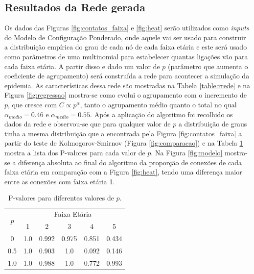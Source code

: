 \subsection{Resultados da Rede gerada}

Os dados das Figuras 
\ref{fig:contatos_faixa} e \ref{fig:heat} serão utilizados como \textit{inputs} do Modelo de Configuração Ponderado, onde aquele vai ser usado para construir a distribuição empírica do grau de cada nó de cada faixa etária e este será usado como parâmetros de uma multinomial para estabelecer quantas ligações vão para cada faixa etária. A partir disso e dado um valor de $p$ 
(parâmetro que aumenta o coeficiente de agrupamento)
será construída a rede para acontecer a simulação da epidemia. As características dessa rede são mostradas na Tabela \ref{table:rrede} e na Figura \ref{fig:regressao}
mostra-se como evolui o agrupamento com o incremento de $p$, que cresce com $C \propto p^{\alpha}$, tanto o agrupamento médio quanto o total no qual $\alpha_{medio } = 0.46$ e $\alpha_{medio } = 0.55$. Após a aplicação do algoritmo foi recolhido os dados da rede e observou-se que para qualquer valor de $p$ a distribuição de graus tinha a mesma distribuição que a encontrada pela Figura \ref{fig:contatos_faixa} a partir do teste de Kolmogorov-Smirnov (Figura \ref{fig:comparacao}) \cite{manual} e na Tabela \ref{tab:pvalor} mostra a lista dos P-valores para cada valor de $p$. Na Figura \ref{fig:modelo}
mostra-se a diferença absoluta ao final do algoritmo da proporção de conexões de cada faixa etária em comparação com a Figura \ref{fig:heat}, tendo uma diferença maior entre as conexões com faixa etária 1.


\begin{table}[H]
    \centering
    \captionsetup{font=normalsize,skip=0.8pt,singlelinecheck=on,labelsep=endash}
    \caption{P-valores para diferentes valores de $p$.}
    \begin{tabular}{|c|c|c|c|c|c|}
    
    \hline
    \multirow{2}{*}{$p$} & \multicolumn{5}{c|}{Faixa Etária} \\ \cline{2-6} 
     & 1 & 2 & 3 & 4 & 5 \\ \hline
    0 & 1.0 & 0.992 & 0.975 & 0.851 & 0.434 \\ \hline
    \rowcolor{Gray}
    0.5 & 1.0 & 0.903 & 1.0 & 0.092 & 0.146 \\ \hline
    1.0 & 1.0 & 0.988 & 1.0 & 0.772 & 0.993 \\ \hline
    \end{tabular}
    \label{tab:pvalor}
\end{table}

